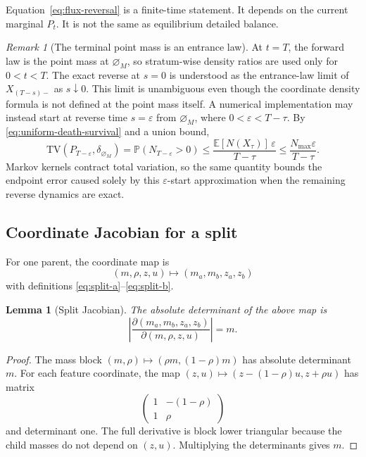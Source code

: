 \documentclass[10pt]{article}
\newtheorem{lemma}[theorem]{Lemma}
\theoremstyle{definition}
\theoremstyle{remark}
\newtheorem{remark}[theorem]{Remark}
\newcommand{\E}{\mathbb{E}}
\newcommand{\Pp}{\mathbb{P}}
\newcommand{\TV}{\mathrm{TV}}
\newcommand{\emptyconfig}{\varnothing_M}
\begin{document}
Equation~\eqref{eq:flux-reversal} is a finite-time statement.  It depends on the current marginal $P_t$.  It is not the same as equilibrium detailed balance.

\begin{remark}[The terminal point mass is an entrance law]
At $t=T$, the forward law is the point mass at $\emptyconfig$, so
stratum-wise density ratios are used only for $0<t<T$.  The exact reverse at
$s=0$ is understood as the entrance-law limit of $X_{(T-s)-}$ as
$s\downarrow0$.
This limit is unambiguous even though the coordinate density formula is not
defined at the point mass itself.  A numerical implementation may instead
start at reverse time $s=\varepsilon$ from $\emptyconfig$, where
$0<\varepsilon<T-\tau$.  By
\eqref{eq:uniform-death-survival} and a union bound,
\begin{equation}
  \TV\!\left(P_{T-\varepsilon},\delta_{\emptyconfig}\right)
  =\Pp(N_{T-\varepsilon}>0)
  \leq
  \frac{\E[N(X_\tau)]\,\varepsilon}{T-\tau}
  \leq\frac{N_{\max}\varepsilon}{T-\tau}.
  \label{eq:entrance-tv-bound}
\end{equation}
Markov kernels contract total variation, so the same quantity bounds the
endpoint error caused solely by this $\varepsilon$-start approximation when
the remaining reverse dynamics are exact.
\end{remark}

\subsection{Coordinate Jacobian for a split}

For one parent, the coordinate map is
\begin{equation}
  (m,\rho,z,u)\longmapsto(m_a,m_b,z_a,z_b)
\end{equation}
with definitions \eqref{eq:split-a}--\eqref{eq:split-b}.

\begin{lemma}[Split Jacobian]
\label{lem:split-jacobian}
The absolute determinant of the above map is
\begin{equation}
  \left|\frac{\partial(m_a,m_b,z_a,z_b)}
  {\partial(m,\rho,z,u)}\right|=m.
  \label{eq:split-jacobian}
\end{equation}
\end{lemma}

\begin{proof}
The mass block $(m,\rho)\mapsto(\rho m,(1-\rho)m)$ has absolute determinant $m$.  For each feature coordinate, the map $(z,u)\mapsto(z-(1-\rho)u,z+\rho u)$ has matrix
\[
  \begin{pmatrix}1&-(1-\rho)\\1&\rho\end{pmatrix}
\]
and determinant one.  The full derivative is block lower triangular because the child masses do not depend on $(z,u)$.  Multiplying the determinants gives $m$.
\end{proof}
\end{document}
